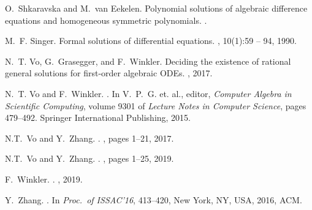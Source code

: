 \documentclass[10pt,a4paper]{article}
\begin{document}
\begin{thebibliography}{10}
O.~Shkaravska and M.~van Eekelen.
\newblock Polynomial solutions of algebraic difference equations and
  homogeneous symmetric polynomials.
.

M.~F. Singer.
\newblock Formal solutions of differential equations.
, 10(1):59 -- 94, 1990.


N.~T. Vo, G.~Grasegger, and F.~Winkler.
\newblock Deciding the existence of rational general solutions for first-order
  algebraic {ODEs}.
, 2017.

N.~T. Vo and F.~Winkler.
.
\newblock In V.~P.~G. et. al., editor, {\em {Computer Algebra in Scientific
  Computing}}, volume 9301 of {\em Lecture Notes in Computer Science}, pages
  479--492. Springer International Publishing, 2015.
  
  

N.T.~Vo and Y.~Zhang.
.
, pages 1--21,  2017.

N.T.~Vo and Y.~Zhang.
.
, pages 1--25,  2019.

F.~Winkler.
.
, 2019. 

Y.~Zhang.
.
\newblock In {\em Proc.\ of ISSAC'16},  413--420, New York, NY, USA, 2016, ACM.



\end{thebibliography}
\end{document}
